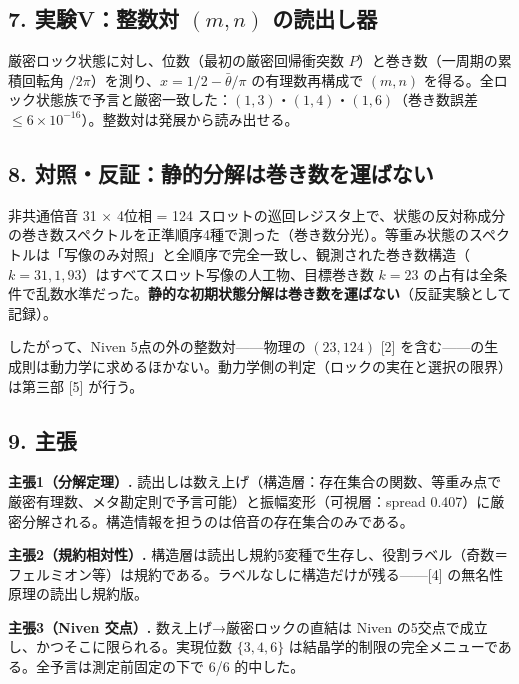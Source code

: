 \documentclass[
  a4paper,
]{ltjsarticle}
\begin{document}
\subsection{\texorpdfstring{7. 実験V：整数対 \((m,n)\)
の読出し器}{7. 実験V：整数対 (m,n) の読出し器}}\label{ux5b9fux9a13vux6574ux6570ux5bfe-mn-ux306eux8aadux51faux3057ux5668}

厳密ロック状態に対し、位数（最初の厳密回帰衝突数
\(P\)）と巻き数（一周期の累積回転角
\(/2\pi\)）を測り、\(x=1/2-\bar\theta/\pi\) の有理数再構成で \((m,n)\)
を得る。全ロック状態族で予言と厳密一致した：\((1,3)\)・\((1,4)\)・\((1,6)\)（巻き数誤差
\(\le6\times10^{-16}\)）。整数対は発展から読み出せる。

\subsection{8.
対照・反証：静的分解は巻き数を運ばない}\label{ux5bfeux7167ux53cdux8a3cux9759ux7684ux5206ux89e3ux306fux5dfbux304dux6570ux3092ux904bux3070ux306aux3044}

非共通倍音 31 × 4位相 = 124
スロットの巡回レジスタ上で、状態の反対称成分の巻き数スペクトルを正準順序4種で測った（巻き数分光）。等重み状態のスペクトルは「写像のみ対照」と全順序で完全一致し、観測された巻き数構造（\(k=31,1,93\)）はすべてスロット写像の人工物、目標巻き数
\(k=23\)
の占有は全条件で乱数水準だった。\textbf{静的な初期状態分解は巻き数を運ばない}（反証実験として記録）。

したがって、Niven 5点の外の整数対------物理の \((23,124)\) {[}2{]}
を含む------の生成則は動力学に求めるほかない。動力学側の判定（ロックの実在と選択の限界）は第三部
{[}5{]} が行う。

\subsection{9. 主張}\label{ux4e3bux5f35}

\textbf{主張1（分解定理）.}
読出しは数え上げ（構造層：存在集合の関数、等重み点で厳密有理数、メタ勘定則で予言可能）と振幅変形（可視層：spread
0.407）に厳密分解される。構造情報を担うのは倍音の存在集合のみである。

\textbf{主張2（規約相対性）.}
構造層は読出し規約5変種で生存し、役割ラベル（奇数＝フェルミオン等）は規約である。ラベルなしに構造だけが残る------{[}4{]}
の無名性原理の読出し規約版。

\textbf{主張3（Niven 交点）.} 数え上げ→厳密ロックの直結は Niven
の5交点で成立し、かつそこに限られる。実現位数 \(\{3,4,6\}\)
は結晶学的制限の完全メニューである。全予言は測定前固定の下で 6/6
的中した。
\end{document}
